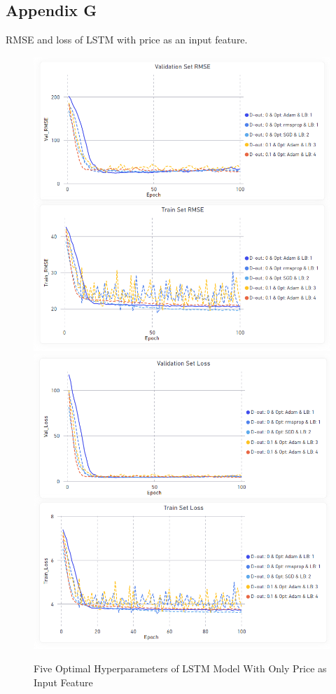 \documentclass[11pt, a4paper]{article}
\begin{document}
\subsection{Appendix G}
\label{appendix:RMSE_Loss_Best_Model}
RMSE and loss of LSTM with price as an input feature.
\begin{figure}[!hb]
    \centering
    \includegraphics[scale = 0.4]{Only_Price_Params_RMSE.png}
    \includegraphics[scale = 0.4]{Only_Price_Params_Loss.png}
    \caption{Five Optimal Hyperparameters of LSTM Model With Only Price as Input Feature}
    \label{fig:lstm_price_rmse_loss}
\end{figure}
\end{document}
